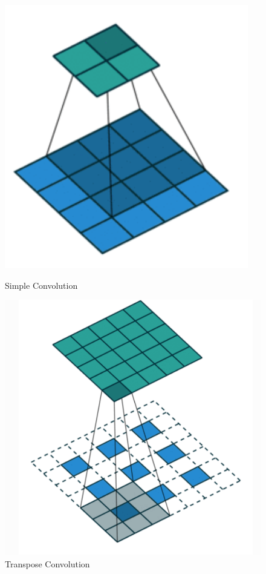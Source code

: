 \begin{figure}[H]
  \centering
    \includegraphics[scale=.5, angle=0]{Files/simple-conv.png}
    \caption[Simple Convolution]{Simple Convolution \cite{Deconv-Theano}}
    \label{fig: Simple Convolution}
  \centering
    \includegraphics[scale=.4, angle=0]{Files/Frational-Stride-Conv.png}
    \caption[Transpose Convolution ]{Transpose Convolution \cite{Deconv-Theano}}
    \label{fig: Strided Convolution}
\end{figure}



